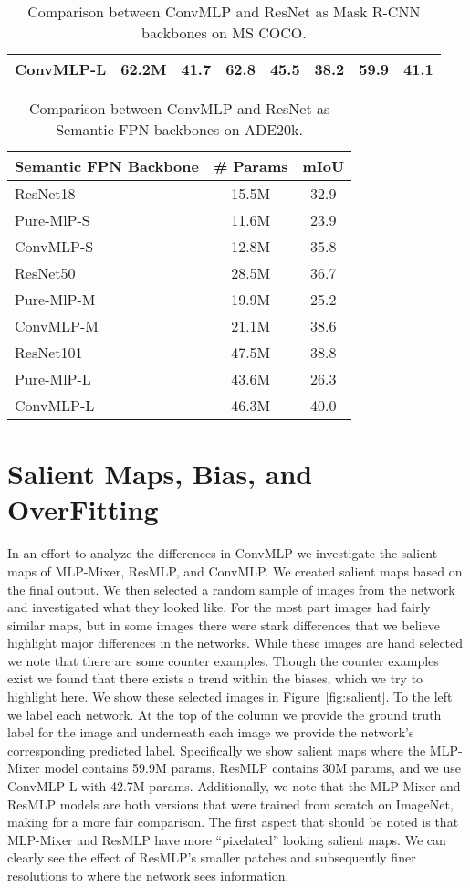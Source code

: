 \documentclass[final]{cvpr}
\begin{document}
\begin{table*}[!ht]
\begin{tabular}{l|c|ccc|ccc}
ConvMLP-L & 62.2M & 41.7 & 62.8 & 45.5 & 38.2 & 59.9 & 41.1 \\
\bottomrule[2pt]
\end{tabular} 
\caption{Comparison between ConvMLP and ResNet as Mask R-CNN backbones on MS COCO.}
\label{tab:maskrcnn}
\end{table*} \begin{table*}[!ht]
\centering
\begin{tabular}{l|c|c}
\toprule[2pt]
Semantic FPN Backbone & \# Params & mIoU \\ 
\midrule[1.5pt]
ResNet18~\cite{he2016deep} & 15.5M & 32.9 \\
Pure-MlP-S & 11.6M & 23.9 \\
ConvMLP-S & 12.8M & 35.8 \\
\midrule
ResNet50~\cite{he2016deep} & 28.5M & 36.7 \\
Pure-MlP-M & 19.9M & 25.2 \\
ConvMLP-M & 21.1M & 38.6  \\
\midrule
ResNet101~\cite{he2016deep} & 47.5M & 38.8 \\
Pure-MlP-L & 43.6M & 26.3 \\
ConvMLP-L & 46.3M & 40.0 \\
\bottomrule[2pt]
\end{tabular} 
\caption{Comparison between ConvMLP and ResNet as Semantic FPN backbones on ADE20k.}
\label{tab:semseg}
\end{table*} 
\section{Salient Maps, Bias, and OverFitting}
In an effort to analyze the differences in ConvMLP we investigate the salient maps of MLP-Mixer, ResMLP, and ConvMLP. 
We created salient maps based on the final output. We then selected a random sample of images from the network and investigated what they looked like.
For the most part images had fairly similar maps, but in some images there were stark differences that we believe highlight major differences in the networks. 
While these images are hand selected we note that there are some counter examples.
Though the counter examples exist we found that there exists a trend within the biases, which we try to highlight here.
We show these selected images in Figure~\ref{fig:salient}. 
To the left we label each network. 
At the top of the column we provide the ground truth label for the image and underneath each image we provide the network's corresponding predicted label.
Specifically we show salient maps where the MLP-Mixer model contains 59.9M params, ResMLP contains 30M params, and we use ConvMLP-L with 42.7M params. 
Additionally, we note that the MLP-Mixer and ResMLP models are both versions that were trained from scratch on ImageNet, making for a more fair comparison. 
The first aspect that should be noted is that MLP-Mixer and ResMLP have more ``pixelated'' looking salient maps.
We can clearly see the effect of ResMLP's smaller patches and subsequently finer resolutions to where the network sees information.
\end{document}
